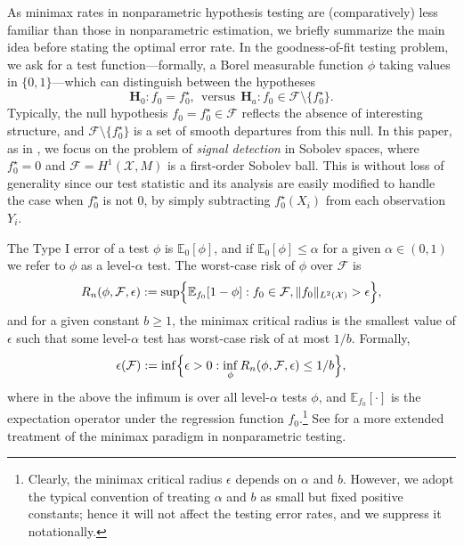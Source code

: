 \documentclass[twoside]{article}
\newcommand{\red}[1]{\textcolor{red}{#1}}
\newcommand{\green}[1]{\textcolor{green}{#1}}
\newcommand{\sbcomment}[1]{{\bf{{\red{{SB --- #1}}}}}}
\newcommand{\agcomment}[1]{{\bf{{\green{{AG --- #1}}}}}}
\newcommand{\1}{\mathbf{1}}
\newcommand{\Xset}{\mathcal{X}}
\newcommand{\Leb}{L}
\newcommand{\mc}[1]{\mathcal{#1}}
\newcommand{\Ebb}{\mathbb{E}}
\theoremstyle{definition}
\theoremstyle{remark}
\begin{document}
As minimax rates in nonparametric hypothesis testing are (comparatively) less familiar than those in nonparametric estimation, we briefly summarize the main idea before stating the optimal error rate. In the goodness-of-fit testing problem, we ask for a test function---formally, a Borel measurable function $\phi$ taking values in $\{0,1\}$---which can distinguish between the hypotheses
\begin{equation}
\mathbf{H}_0: f_0 = f_0^{\star}, ~~\textrm{versus}~~ \mathbf{H}_a: f_0 \in \mc{F} \setminus \{f_0^{\star}\}.
\end{equation} 
Typically, the null hypothesis $f_0 = f_0^{\star} \in \mc{F}$ reflects the absence of interesting structure, and $\mc{F} \setminus  \{f_0^{\star}\}$ is a set of smooth departures from this null. In this paper, as in \citet{ingster2009}, we focus on the problem of \emph{signal detection} in Sobolev spaces, where $f_0^{\star} = 0$ and $\mc{F} = H^1(\Xset,M)$ is a first-order Sobolev ball. This is without loss of generality since our test statistic and its analysis are easily modified to handle the case when $f_0^{\star}$ is not $0$, by simply subtracting $f_0^{\star}(X_i)$ from each observation $Y_i$.



The Type I error of a test $\phi$ is $\mathbb{E}_0[\phi]$, and if $\mathbb{E}_0[\phi] \leq \alpha$ for a given $\alpha \in (0,1)$ we refer to $\phi$ as a level-$\alpha$ test. The worst-case risk of $\phi$ over $\mc{F}$ is
\begin{equation*}
R_n(\phi, \mc{F}, \epsilon) := \sup\Bigl\{\mathbb{E}_{f_0}[1 - \phi]: f_0 \in \mc{F}, \|f_0\|_{\Leb^2(\mc{X})} > \epsilon\Bigr\},
\end{equation*}
and for a given constant $b \geq 1$, the minimax critical radius is the smallest value of $\epsilon$ such that some level-$\alpha$ test has worst-case risk of at most $1/b$. Formally,
\begin{equation*}
\epsilon(\mc{F}) := \inf\Bigl\{\epsilon > 0: \inf_{\phi} R_n(\phi,\mc{F},\epsilon) \leq 1/b \Bigr\},
\end{equation*} 
where in the above the infimum is over all level-$\alpha$ tests $\phi$, and $\Ebb_{f_0}[\cdot]$ is the expectation operator under the regression function $f_0$.\footnote{Clearly, the minimax critical radius $\epsilon$ depends on $\alpha$ and $b$. However, we adopt the typical convention of treating $\alpha$ and $b$ as small but fixed positive constants; hence it will not affect the testing error rates, and we suppress it notationally.} See \citet{ingster82,ingster87,ingster2012} for a more extended treatment of the minimax paradigm in nonparametric testing. 
\end{document}
